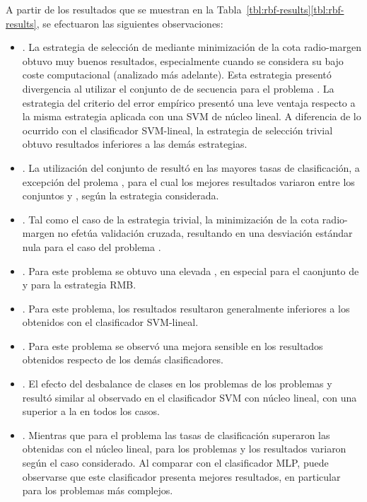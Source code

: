 %

A partir de los resultados que se muestran en la
\iflatexml{}Tabla~\ref{tbl:rbf-results}\else\autoref{tbl:rbf-results}\fi{},
se efectuaron las siguientes observaciones:
%
%
\begin{itemize}
\item
  .
  La estrategia de selección de  mediante minimización de la
  cota radio-margen obtuvo muy buenos resultados, especialmente cuando
  se considera su bajo coste computacional (analizado más adelante).
  Esta estrategia presentó divergencia al utilizar el conjunto de
   de secuencia  para el problema \prob\mipred{}.
  La estrategia del criterio del error empírico presentó una leve
  ventaja respecto a la misma estrategia aplicada con una SVM de
  núcleo lineal.
  A diferencia de lo ocurrido con el clasificador SVM-lineal, la
  estrategia de selección trivial obtuvo resultados inferiores a las
  demás estrategias.
\item
  .
  La utilización del conjunto de   resultó en las
  mayores tasas de clasificación, a excepción del prolema
  \prob\mipred{}, para el cual los mejores resultados variaron entre
  los conjuntos  y , según la estrategia considerada.
\item
  .
  Tal como el caso de la estrategia trivial, la minimización de la
  cota radio-margen no efetúa validación cruzada, resultando en una
  desviación estándar nula para el caso del problema
  \prob\tripletsvm{}.  
\item
  .
  Para este problema se obtuvo una elevada \SE{}, en especial para el
  caonjunto de   y para la estrategia RMB.
\item
  .
  Para este problema, los resultados resultaron generalmente
  inferiores a los obtenidos con el clasificador SVM-lineal.
\item
  .
  Para este problema se observó una mejora sensible en los resultados
  obtenidos respecto de los demás clasificadores.
\item
  .
  El efecto del desbalance de clases en los problemas de los problemas
  \prob\mipred{} y \prob\micropred{} resultó similar al observado en
  el clasificador SVM con núcleo lineal, con una \SP{} superior a la
  \SE{} en todos los casos.
\item
  .
  Mientras que para el problema \prob\tripletsvm{} las tasas de
  clasificación superaron las obtenidas con el núcleo lineal, para los
  problemas \prob\mipred{} y \prob\micropred{} los resultados variaron
  según el caso considerado.
  Al comparar con el clasificador MLP, puede observarse que este
  clasificador presenta mejores resultados, en particular para los
  problemas más complejos.
\end{itemize}
%
